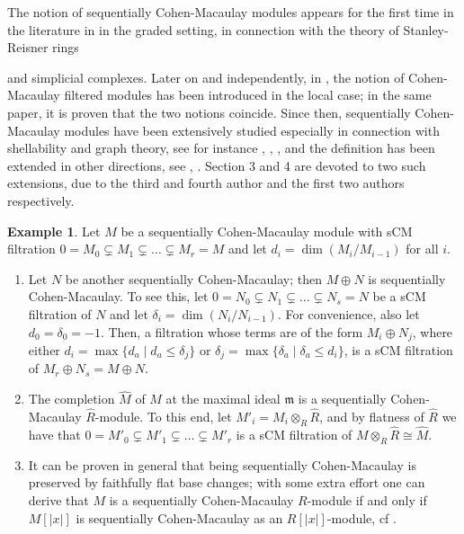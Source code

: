 \documentclass[12pt]{amsart}
\theoremstyle{definition}
\theoremstyle{definition}
\newtheorem{example}[theorem]{Example}
\newcommand{\m}{\mathfrak{m}}
\renewcommand{\leq}{\leqslant}
\begin{document}
  
The notion of sequentially Cohen-Macaulay modules appears for the first time in the literature in \cite{St96} in the graded setting, in connection with the theory of Stanley-Reisner rings {and simplicial complexes. Later on and independently, in \cite{Sch99}, the notion of Cohen-Macaulay filtered modules has been introduced in the local case; in the same paper, it is proven that the two notions coincide.  Since then, sequentially Cohen-Macaulay modules have been extensively studied especially in connection with shellability and graph theory, see for instance
  \cite{VTV08}
  \cite{HTYZ11}
  \cite{AM15},
  \cite{Go16}, 
  \cite{ABG17},
    and the definition has been extended in other directions, see  \cite{CC07}, \cite{R17}. Section 3 and 4 are devoted to two such extensions, due to the third and fourth author and the first two authors respectively.
  
  
      \begin{example}\label{nuovo} Let $M$ be a sequentially Cohen-Macaulay module with sCM filtration $0 = M_0 \subsetneq M_1 \subsetneq \dots \subsetneq M_r=M$ and let $d_i=\dim(M_i/M_{i-1})$ for all $i$.
        \begin{enumerate}[(1)]
        \item Let  $N$ be another sequentially Cohen-Macaulay; then $M \oplus N$ is sequentially Cohen-Macaulay. To see this, let $0 =N_0 \subsetneq N_1 \subsetneq \ldots \subsetneq N_s=N$ be a sCM filtration of $N$ and let $\delta_i= \dim(N_i/N_{i-1})$. For convenience, also let $d_0=\delta_0=-1$. Then,  a filtration whose terms are of the form $M_i\oplus N_j$, where either $d_i=\max\{d_a \mid d_a \leq \delta_j\}$ or $\delta_j=\max\{\delta_a \mid \delta_a \leq d_i\}$, is a sCM  filtration of $M_r\oplus N_s = M\oplus N$.
          
  \item The completion $\widehat{M}$ of $M$ at the maximal ideal $\m$ is a sequentially Cohen-Macaulay $\widehat{R}$-module. To this end, let $M'_i= M_i \otimes_R \widehat{R}$, and by flatness of $\widehat{R}$ we have that  $0 = M'_0 \subsetneq M'_1 \subsetneq \ldots \subsetneq M'_r$ is a sCM filtration of $M \otimes_R \widehat{R} \cong \widehat{M}$.
  \item It can be proven in general  that being sequentially Cohen-Macaulay is preserved by faithfully flat base changes; with some extra effort one can derive that $M$ is a sequentially Cohen-Macaulay $R$-module if and only if $M[|x|]$ is sequentially Cohen-Macaulay as an $R[|x|]$-module, cf \cite[Theorem 6.2]{Sch99}.  
        \end{enumerate}
      \end{example}
      
}
\end{document}
